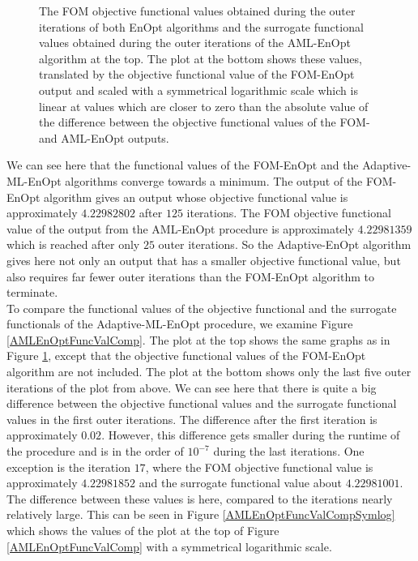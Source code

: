\begin{figure}
\caption{\label{FOMAMLEnOptFuncValComp}The FOM objective functional values obtained during the outer iterations of both EnOpt algorithms and the surrogate functional values obtained during the outer iterations of the AML-EnOpt algorithm at the top. The plot at the bottom shows these values, translated by the objective functional value of the FOM-EnOpt output and scaled with a symmetrical logarithmic scale which is linear at values which are closer to zero than the absolute value of the difference between the objective functional values of the FOM- and AML-EnOpt outputs.}
\end{figure}

We can see here that the functional values of the FOM-EnOpt and the Adaptive-ML-EnOpt algorithms converge towards a minimum. The output of the FOM-EnOpt algorithm gives an output whose objective functional value is approximately $4.22982802$ after $125$ iterations. The FOM objective functional value of the output from the AML-EnOpt procedure is approximately $4.22981359$ which is reached after only $25$ outer iterations. So the Adaptive-EnOpt algorithm gives here not only an output that has a smaller objective functional value, but also requires far fewer outer iterations than the FOM-EnOpt algorithm to terminate.\\

To compare the functional values of the objective functional and the surrogate functionals of the Adaptive-ML-EnOpt procedure, we examine Figure \ref{AMLEnOptFuncValComp}. The plot at the top shows the same graphs as in Figure \ref{FOMAMLEnOptFuncValComp}, except that the objective functional values of the FOM-EnOpt algorithm are not included. The plot at the bottom shows only the last five outer iterations of the plot from above. We can see here that there is quite a big difference between the objective functional values and the surrogate functional values in the first outer iterations. The difference after the first iteration is approximately $0.02$. However, this difference gets smaller during the runtime of the procedure and is in the order of $10^{-7}$ during the last iterations. One exception is the iteration $17$, where the FOM objective functional value is approximately $4.22981852$ and the surrogate functional value about $4.22981001$. The difference between these values is here, compared to the iterations nearly relatively large. This can be seen in Figure \ref{AMLEnOptFuncValCompSymlog} which shows the values of the plot at the top of Figure \ref{AMLEnOptFuncValComp} with a symmetrical logarithmic scale.

